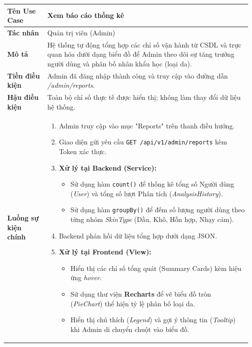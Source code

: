 \documentclass[12pt,a4paper]{article}
\begin{document}
\begin{center}
\renewcommand{\arraystretch}{1.4}
\begin{tabular}{|p{4cm}|p{10cm}|}
\hline
\rowcolor{blue!15}
\textbf{Tên Use Case} & \textbf{Xem báo cáo thống kê} \\ \hline
\textbf{Tác nhân} & Quản trị viên (Admin) \\ \hline
\textbf{Mô tả} & Hệ thống tự động tổng hợp các chỉ số vận hành từ CSDL và trực quan hóa dưới dạng biểu đồ để Admin theo dõi sự tăng trưởng người dùng và phân bố nhân khẩu học (loại da). \\ \hline
\textbf{Tiền điều kiện} & Admin đã đăng nhập thành công và truy cập vào đường dẫn \textit{/admin/reports}. \\ \hline
\textbf{Hậu điều kiện} & Toàn bộ chỉ số thực tế được hiển thị; không làm thay đổi dữ liệu hệ thống. \\ \hline
\textbf{Luồng sự kiện chính} & 
\begin{enumerate}
    \item Admin truy cập vào mục "Reports" trên thanh điều hướng.
    \item Giao diện gửi yêu cầu \texttt{GET /api/v1/admin/reports} kèm Token xác thực.
    \item \textbf{Xử lý tại Backend (Service):}
        \begin{itemize}
            \item Sử dụng hàm \texttt{count()} để thống kê tổng số Người dùng (\textit{User}) và tổng số lượt Phân tích (\textit{AnalysisHistory}).
            \item Sử dụng hàm \texttt{groupBy()} để đếm số lượng người dùng theo từng nhóm \textit{SkinType} (Dầu, Khô, Hỗn hợp, Nhạy cảm).
        \end{itemize}
    \item Backend phản hồi dữ liệu tổng hợp dưới dạng JSON.
    \item \textbf{Xử lý tại Frontend (View):}
        \begin{itemize}
            \item Hiển thị các chỉ số tổng quát (Summary Cards) kèm hiệu ứng \textit{hover}.
            \item Sử dụng thư viện \textbf{Recharts} để vẽ biểu đồ tròn (\textit{PieChart}) thể hiện tỷ lệ phân bố loại da.
            \item Hiển thị chú thích (\textit{Legend}) và gợi ý thông tin (\textit{Tooltip}) khi Admin di chuyển chuột vào biểu đồ.
        \end{itemize}

\end{enumerate}
\end{tabular}
\end{center}
\end{document}
